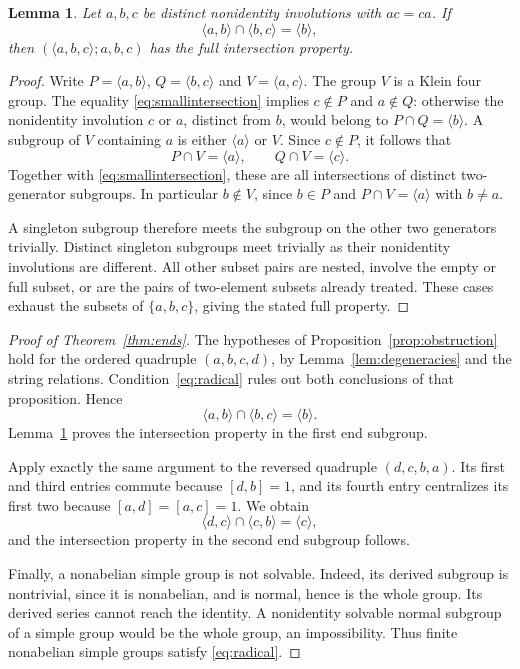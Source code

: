 \documentclass[11pt]{article}
\newtheorem{lemma}[theorem]{Lemma}
\theoremstyle{definition}\newtheorem{definition}[theorem]{Definition}
\newcommand{\gen}[1]{\langle #1\rangle}
\begin{document}
\begin{lemma}\label{lem:rankthree}
Let $a,b,c$ be distinct nonidentity involutions with $ac=ca$.  If
\begin{equation}\label{eq:smallintersection}
                 \gen{a,b}\cap\gen{b,c}=\gen b,
\end{equation}
then $(\gen{a,b,c};a,b,c)$ has the full intersection property.
\end{lemma}
\begin{proof}
Write $P=\gen{a,b}$, $Q=\gen{b,c}$ and $V=\gen{a,c}$.
The group $V$ is a Klein four group.  The equality
\eqref{eq:smallintersection} implies $c\notin P$ and $a\notin Q$:
otherwise the nonidentity involution $c$ or $a$, distinct from $b$,
would belong to $P\cap Q=\gen b$.  A subgroup of $V$ containing $a$
is either $\gen a$ or $V$.  Since $c\notin P$, it follows that
\[
               P\cap V=\gen a,\qquad Q\cap V=\gen c.
\]
Together with \eqref{eq:smallintersection}, these are all intersections
of distinct two-generator subgroups.  In particular $b\notin V$, since
$b\in P$ and $P\cap V=\gen a$ with $b\ne a$.

A singleton subgroup therefore meets the subgroup on the other two
generators trivially.  Distinct singleton subgroups meet trivially as
their nonidentity involutions are different.  All other subset pairs are
nested, involve the empty or full subset, or are the pairs of
two-element subsets already treated.  These cases exhaust the subsets
of $\{a,b,c\}$, giving the stated full property.
\end{proof}

\begin{proof}[Proof of Theorem~\ref{thm:ends}]
The hypotheses of Proposition~\ref{prop:obstruction} hold for the ordered
quadruple $(a,b,c,d)$, by Lemma~\ref{lem:degeneracies} and the string
relations.  Condition~\eqref{eq:radical} rules out both conclusions of
that proposition.  Hence
\[
                         \gen{a,b}\cap\gen{b,c}=\gen b.
\]
Lemma~\ref{lem:rankthree} proves the intersection property in the first
end subgroup.

Apply exactly the same argument to the reversed quadruple $(d,c,b,a)$.
Its first and third entries commute because $[d,b]=1$, and its fourth
entry centralizes its first two because $[a,d]=[a,c]=1$.  We obtain
\[
                         \gen{d,c}\cap\gen{c,b}=\gen c,
\]
and the intersection property in the second end subgroup follows.

Finally, a nonabelian simple group is not solvable.  Indeed, its derived
subgroup is nontrivial, since it is nonabelian, and is normal, hence is
the whole group.  Its derived series cannot reach the identity.  A
nonidentity solvable normal subgroup of a simple group would be the
whole group, an impossibility.  Thus finite nonabelian simple groups
satisfy \eqref{eq:radical}.
\end{proof}
\end{document}
